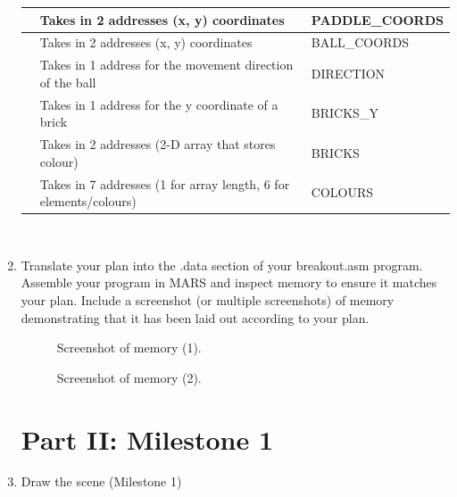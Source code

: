 \documentclass{article}
\begin{document}
\begin{enumerate}
\begin{table}[]
\begin{tabular}{|l|l|l|}
                 & Takes in 2 addresses (x, y) coordinates                           & PADDLE\_COORDS \\ \hline
                 & Takes in 2 addresses (x, y) coordinates                           & BALL\_COORDS   \\ \hline
                 & Takes in 1 address for the movement direction of the ball         & DIRECTION      \\ \hline
                 & Takes in 1 address for the y coordinate of a brick                & BRICKS\_Y      \\ \hline
                 & Takes in 2 addresses (2-D array that stores colour)               & BRICKS         \\ \hline
                 & Takes in 7 addresses (1 for array length, 6 for elements/colours) & COLOURS        \\ \hline
\end{tabular}
\end{table}

\\

\newpage
\item Translate your plan into the .data section of your breakout.asm program. Assemble your program in MARS and inspect memory to ensure it matches your plan. Include a screenshot (or multiple screenshots) of memory demonstrating that it has been laid out according to your plan.

\begin{figure}[ht!]
    \centering
    \caption{Screenshot of memory (1).}
    \label{f:part1_memory1}
\end{figure}

\begin{figure}[ht!]
    \centering
    \caption{Screenshot of memory (2).}
    \label{f:part1_memory2}
\end{figure}

\newpage

\section{Part II: Milestone 1}

\item Draw the scene (Milestone 1)


\end{enumerate}
\end{document}

